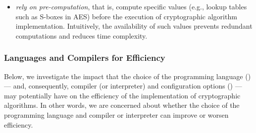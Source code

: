 \begin{itemize}
\begin{itemize}
\begin{itemize}
			\item \textit{linked lists}, which allow efficient insertion and deletion at both ends;
			
			\item \textit{hash maps}, which associate each element with a key for fast lookup;
			
			\item \textit{(binary) trees}, which allow efficient searching, insertion, and deletion operations.
			
		\end{itemize} 
		
		In general, complex arithmetic operations in cryptographic algorithm implementations may be more or less (memory) efficient according to how data are represented. For instance, a point on an elliptic curve is often stored as the $x$-coordinate only of an affine point $(x,y)$. However, computations performed on the projective plane $(x,y,z)$ are more efficient as they avoid the costly inversions typically needed in affine coordinates. On top of that, mixed operations between projective and affine coordinates allow for the direct use of large pre-computation tables, further enhancing performance;\footnote{A comprehensive list of formulae for each curve can be found in the Explicit-Formula Database (EFD) available at \url{https://www.hyperelliptic.org/EFD/}}
		
		\item \textit{rely on pre-computation}, that is, compute specific values (e.g., lookup tables such as S-boxes in AES) before the execution of cryptographic algorithm implementation. Intuitively, the availability of such values prevents redundant computations and reduces time complexity.
		
	\end{itemize}
	
\end{itemize}
	




\subsubsection{Languages and Compilers for Efficiency}\label{sec:security_of_cryptographic_algorithms:performance:languages_and_compilers}

Below, we investigate the impact that the choice of the programming language () --- and, consequently, compiler (or interpreter) and configuration options () --- may potentially have on the efficiency of the implementation of cryptographic algorithms. In other words, we are concerned about whether the choice of the programming language and compiler or interpreter can improve or worsen efficiency.


